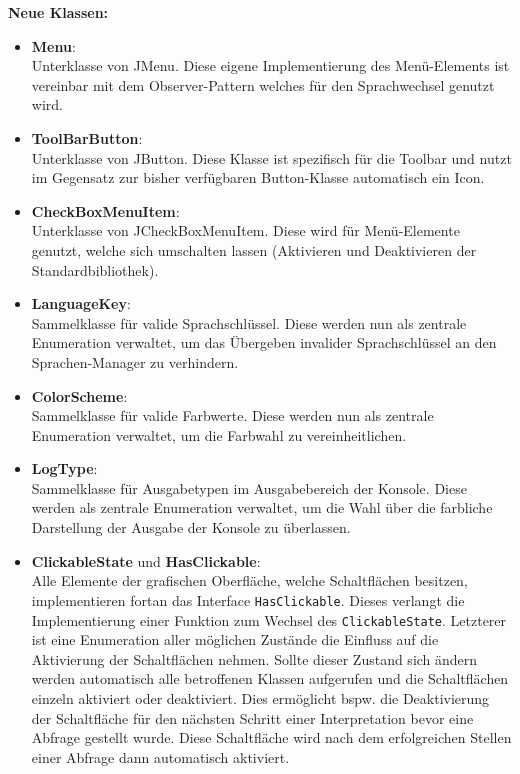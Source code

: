 \documentclass[parskip=full,11pt,twoside]{scrartcl}
\begin{document}
\textbf{Neue Klassen:}\\
\begin{itemize}
	\item \textbf{Menu}:\\
	Unterklasse von JMenu. Diese eigene Implementierung des Menü-Elements ist vereinbar mit dem Observer-Pattern welches für den Sprachwechsel genutzt wird.
	\item \textbf{ToolBarButton}:\\
	Unterklasse von JButton. Diese Klasse ist spezifisch für die Toolbar und nutzt im Gegensatz zur bisher verfügbaren Button-Klasse automatisch ein Icon.
	\item \textbf{CheckBoxMenuItem}:\\
	Unterklasse von JCheckBoxMenuItem. Diese wird für Menü-Elemente genutzt, welche sich umschalten lassen (Aktivieren und Deaktivieren der Standardbibliothek).
	\item \textbf{LanguageKey}:\\
	Sammelklasse für valide Sprachschlüssel. Diese werden nun als zentrale Enumeration verwaltet, um das Übergeben invalider Sprachschlüssel an den Sprachen-Manager zu verhindern.
	\item \textbf{ColorScheme}:\\
	Sammelklasse für valide Farbwerte. Diese werden nun als zentrale Enumeration verwaltet, um die Farbwahl zu vereinheitlichen.
	\item \textbf{LogType}:\\
	Sammelklasse für Ausgabetypen im Ausgabebereich der Konsole. Diese werden als zentrale Enumeration verwaltet, um die Wahl über die farbliche Darstellung der Ausgabe der Konsole zu überlassen.
	\item \textbf{ClickableState} und \textbf{HasClickable}:\\
	Alle Elemente der grafischen Oberfläche, welche Schaltflächen besitzen, implementieren fortan das Interface \texttt{HasClickable}. Dieses verlangt die Implementierung einer Funktion zum Wechsel des \texttt{ClickableState}. Letzterer ist eine Enumeration aller möglichen Zustände die Einfluss auf die Aktivierung der Schaltflächen nehmen. Sollte dieser Zustand sich ändern werden automatisch alle betroffenen Klassen aufgerufen und die Schaltflächen einzeln aktiviert oder deaktiviert. Dies ermöglicht bspw. die Deaktivierung der Schaltfläche für den nächsten Schritt einer Interpretation bevor eine Abfrage gestellt wurde. Diese Schaltfläche wird nach dem erfolgreichen Stellen einer Abfrage dann automatisch aktiviert.
\end{itemize}
\end{document}
